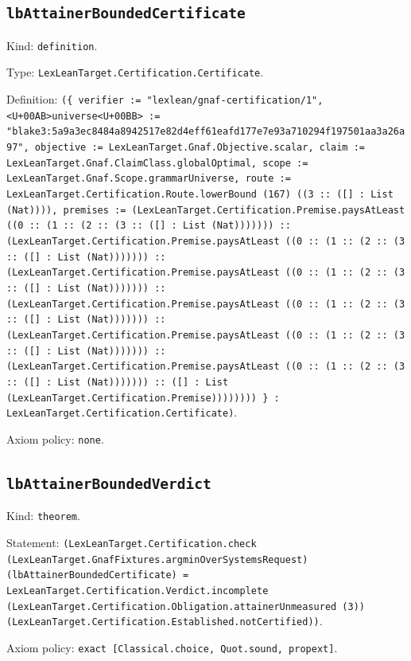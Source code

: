 \documentclass[11pt]{article}
\begin{document}
\subsection*{\texttt{lbAttainerBoundedCertificate}}
\noindent Kind: \texttt{definition}.\par
\noindent Type: \texttt{LexLeanTarget.Certification.Certificate}.\par
\noindent Definition: \texttt{(\{ verifier := "lexlean/gnaf-certification/1", <U+00AB>universe<U+00BB> := "blake3:5a9a3ec8484a8942517e82d4eff61eafd177e7e93a710294f197501aa3a26a97", objective := LexLeanTarget.Gnaf.Objective.scalar, claim := LexLeanTarget.Gnaf.ClaimClass.globalOptimal, scope := LexLeanTarget.Gnaf.Scope.grammarUniverse, route := LexLeanTarget.Certification.Route.lowerBound (167) ((3 :: ([] : List (Nat)))), premises := (LexLeanTarget.Certification.Premise.paysAtLeast ((0 :: (1 :: (2 :: (3 :: ([] : List (Nat))))))) :: (LexLeanTarget.Certification.Premise.paysAtLeast ((0 :: (1 :: (2 :: (3 :: ([] : List (Nat))))))) :: (LexLeanTarget.Certification.Premise.paysAtLeast ((0 :: (1 :: (2 :: (3 :: ([] : List (Nat))))))) :: (LexLeanTarget.Certification.Premise.paysAtLeast ((0 :: (1 :: (2 :: (3 :: ([] : List (Nat))))))) :: (LexLeanTarget.Certification.Premise.paysAtLeast ((0 :: (1 :: (2 :: (3 :: ([] : List (Nat))))))) :: (LexLeanTarget.Certification.Premise.paysAtLeast ((0 :: (1 :: (2 :: (3 :: ([] : List (Nat))))))) :: ([] : List (LexLeanTarget.Certification.Premise)))))))) \} : LexLeanTarget.Certification.Certificate)}.\par
\noindent Axiom policy: \texttt{none}.\par
\subsection*{\texttt{lbAttainerBoundedVerdict}}
\noindent Kind: \texttt{theorem}.\par
\noindent Statement: \texttt{(LexLeanTarget.Certification.check (LexLeanTarget.GnafFixtures.argminOverSystemsRequest) (lbAttainerBoundedCertificate) = LexLeanTarget.Certification.Verdict.incomplete (LexLeanTarget.Certification.Obligation.attainerUnmeasured (3)) (LexLeanTarget.Certification.Established.notCertified))}.\par
\noindent Axiom policy: \texttt{exact [Classical.choice, Quot.sound, propext]}.\par
\end{document}
